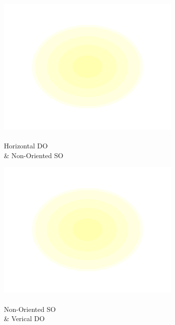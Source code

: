 \documentclass[journal,onecolumn]{IEEEtran}
\begin{document}
\begin{figure}[h]
\begin{subfigure}[b]{0.2\textwidth}
            \includegraphics[width=.85\linewidth]{map-j_3_4}
            \caption{\\ Horizontal DO \\ \& Non-Oriented SO}
    \end{subfigure}%
    \par \bigskip
    \begin{subfigure}[b]{0.2\textwidth}
            \centering
            \captionsetup{justification=centering}
            \includegraphics[width=.85\linewidth]{map-j_4_1}
            \caption{\\ Non-Oriented SO \\ \& Verical DO}
    \end{subfigure}%
    \begin{subfigure}[b]{0.2\textwidth}
            \centering
            \captionsetup{justification=centering}

\end{subfigure}
\end{figure}
\end{document}
